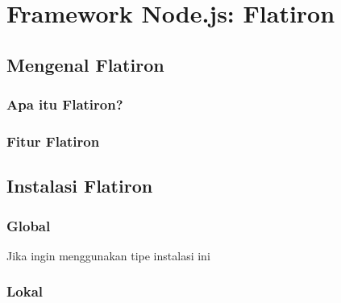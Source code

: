 \chapter{Framework Node.js: Flatiron}

\section{Mengenal Flatiron}

\subsection{Apa itu Flatiron?}

\subsection{Fitur Flatiron}

\section{Instalasi Flatiron}

\subsection{Global}
Jika ingin menggunakan tipe instalasi ini

\subsection{Lokal}

